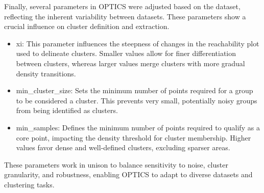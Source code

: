 Finally, several parameters in OPTICS were adjusted based on the dataset, reflecting the inherent variability between
datasets. These parameters show a crucial influence on cluster definition and extraction.
\begin{itemize}
    \item xi: This parameter influences the steepness of changes in the reachability plot used to
    delineate clusters. Smaller values allow for finer differentiation between clusters, whereas larger values merge
     clusters with more gradual density transitions.
    \item min\_cluster\_size: Sets the minimum number of points required for a group to be considered
     a cluster. This prevents very small, potentially noisy groups from being identified as clusters.
    \item min\_samples: Defines the minimum number of points required to qualify as a core point,
    impacting the density threshold for cluster membership. Higher values favor dense and well-defined clusters,
    excluding sparser areas.
\end{itemize}

These parameters work in unison to balance sensitivity to noise, cluster granularity, and robustness, enabling OPTICS
to adapt to diverse datasets and clustering tasks.
